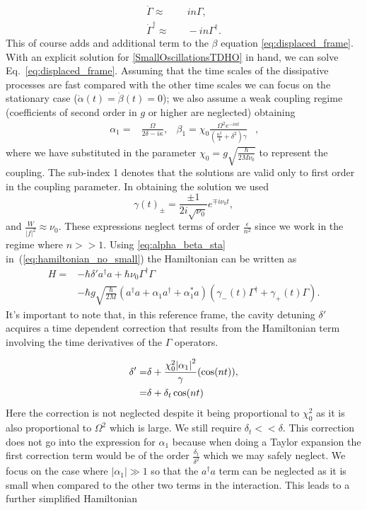 \documentclass[reprint, amsmath,amssymb, aps,pra]{revtex4-1}
\begin{document}
\begin{align}\label{eq:DotGammavsGamma}
\dot{\Gamma} \approx & \quad in\Gamma,\\
\dot{\Gamma}^\dagger \approx & \quad -in\Gamma^\dagger.
\end{align} This of course adds and additional term to the $\beta$ equation \eqref{eq:displaced_frame}. With an explicit solution for \eqref{SmallOscillationsTDHO} in hand,
we can solve Eq.~\eqref{eq:displaced_frame}. Assuming that the time
scales of the dissipative processes are fast compared with the other
time scales we can focus on the stationary case
($\dot{\alpha}(t)=\dot{\beta}(t)=0$); we also assume a weak coupling
regime (coefficients of second order in $g$ or higher are neglected)
obtaining
\begin{align}\label{eq:alpha_beta_sta}
\alpha_1 =& \frac{\Omega}{2\delta-i\kappa},& \beta_1 =\chi_0\frac{\Omega^2 e^{-int}}{(\frac{\kappa^2}{4}+\delta^2)\gamma}& ,
\end{align} where we have substituted in the parameter $\chi_0 = g\sqrt{\frac{\hbar}{2M\nu_0}}$ to represent the coupling.
The  sub-index 1 denotes that the solutions are valid only to first
order in the coupling parameter.  In obtaining the solution we used
\begin{equation}\label{GammaCoefficients}
\gamma(t)_\pm= \frac{\pm 1}{2i\sqrt{\nu_0}}e^{\mp i\nu_0 t},
\end{equation}
and  $\frac{W}{|f|^2} \approx \nu_0$. These expressions neglect terms of order $\frac{\epsilon}{n^2}$  since we work in the regime where $n >> 1$. Using \eqref{eq:alpha_beta_sta} in~(\ref{eq:hamiltonian_no_small})
the Hamiltonian can be written as
\begin{align}
H =& -\hbar \delta' a^{\dagger}a +\hbar\nu_0\Gamma^{\dagger}\Gamma \\
&-\hbar g\sqrt{\frac{\hbar}{2M}}(a^{\dagger}a +\alpha_1 a^{\dagger}+\alpha^*_1 a)(\gamma_-(t)\Gamma^{\dagger}+\gamma_+(t)\Gamma)\nonumber.
\end{align} It's important to note that, in this reference frame, the cavity detuning $\delta'$ acquires a time dependent correction that results from the Hamiltonian term involving the time derivatives of the $\Gamma$ operators. 

\begin{align}
\delta' =& \delta +\frac{\chi_0^2 \abs{\alpha_1}^2}{\gamma} (\cos(nt)), \nonumber\\
=& \delta + \delta_t\cos(nt)
\end{align} Here the correction is not neglected despite it being proportional to $\chi_0^2$ as it is also proportional to $\Omega^2$ which is large. We still require $\delta_t<<\delta$. This correction does not go into the expression for $\alpha_1$ because when doing a Taylor expansion the first correction term would be of the order $\frac{\delta_t}{\delta^2}$ which we may safely neglect.
We focus on the case where $|\alpha_1| \gg 1$
\cite{BarberisLC} so that the $a^\dagger a$ term can be neglected as
it is small when compared to the other two terms in the interaction.
This leads to a further simplified Hamiltonian
\end{document}
